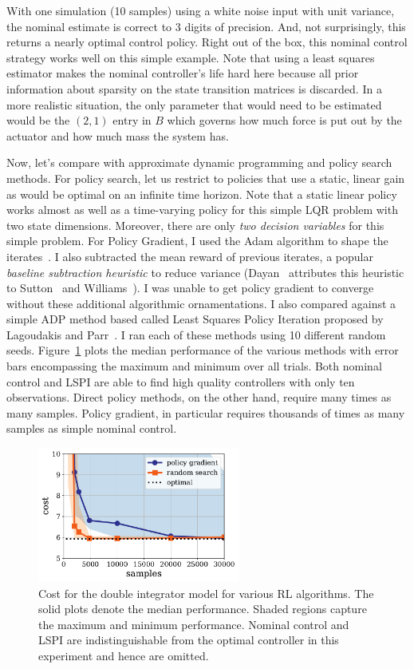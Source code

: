 \documentclass[11pt]{article}
\newcommand{\fig}[1]{Figure~\ref{fig:#1}}
\numberwithin{equation}{section}
\begin{document}
With one simulation (10 samples) using a white noise input with unit variance, the nominal estimate is correct to 3 digits of precision. And, not surprisingly, this returns a nearly optimal control policy. Right out of the box, this nominal control strategy works well on this simple example. Note that using a least squares estimator makes the nominal controller's life hard here because all prior information about sparsity on the state transition matrices is discarded.  In a more realistic situation, the only parameter that would need to be estimated would be the $(2,1)$ entry in $B$ which governs how much force is put out by the actuator and how much mass the system has.

Now, let's compare with approximate dynamic programming and policy search methods. For policy search, let us restrict to policies that use a static, linear gain as would be optimal on an infinite time horizon. Note that a static linear policy works almost as well as a time-varying policy for this simple LQR problem with two state dimensions. Moreover, there are only \emph{two decision variables} for this simple problem. For Policy Gradient, I used the Adam algorithm to shape the iterates~\cite{kingma2014adam}. I also subtracted the mean reward of previous iterates, a popular \emph{baseline subtraction heuristic} to reduce variance (Dayan~\cite{dayan1991reinforcement} attributes this heuristic to Sutton~\cite{sutton1984temporal} and Williams~\cite{Williams88}).  I was unable to get policy gradient to converge without these additional algorithmic ornamentations. I also compared against a simple ADP method based called Least Squares Policy Iteration proposed by Lagoudakis and Parr~\cite{lagoudakis2003least}. I ran each of these methods using 10 different random seeds. \fig{2int-lqr} plots the median performance of the various methods with error bars  encompassing the maximum and minimum over all trials.  Both nominal control and LSPI are able to find high quality controllers with only ten observations. Direct policy methods, on the other hand, require many times as many samples. Policy gradient, in particular requires thousands of times as many samples as simple nominal control.

\begin{figure}[t]
	      \centering
	        \includegraphics[height=1.75in]{figs/dbl_int.pdf}
  \caption{
Cost for the double integrator model for various RL algorithms. The solid plots denote the median performance. Shaded regions capture the maximum and minimum performance. Nominal control and LSPI are indistinguishable from the optimal controller in this experiment and hence are omitted.}\label{fig:2int-lqr}
\end{figure}
\end{document}
